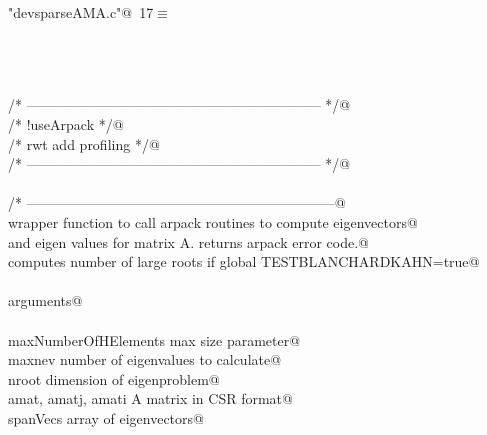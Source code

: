 \documentclass[12pt]{article}
\begin{document}
\begin{flushleft} \small
\begin{minipage}{\linewidth}\label{scrap5}\raggedright\small
{} \verb@"devsparseAMA.c"@\nobreak\ {\footnotesize {17}}$\equiv$
\vspace{-1ex}
\begin{list}{}{} \item
\mbox{}\verb@@\\
\mbox{}\verb@@\\
\mbox{}\verb@@\\
\mbox{}\verb@/* --------------------------------------------------------------- */@\\
\mbox{}\verb@/* !useArpack                                                      */@\\
\mbox{}\verb@/* rwt add profiling                                               */@\\
\mbox{}\verb@/* --------------------------------------------------------------- */@\\
\mbox{}\verb@@\\
\mbox{}\verb@/* ------------------------------------------------------------------@\\
\mbox{}\verb@        wrapper function to call arpack routines to compute eigenvectors@\\
\mbox{}\verb@        and eigen values for matrix A.  returns arpack error code.@\\
\mbox{}\verb@        computes number of large roots if global TESTBLANCHARDKAHN=true@\\
\mbox{}\verb@@\\
\mbox{}\verb@        arguments@\\
\mbox{}\verb@@\\
\mbox{}\verb@                maxNumberOfHElements                            max size parameter@\\
\mbox{}\verb@                maxnev                                                          number of eigenvalues to calculate@\\
\mbox{}\verb@                nroot                                                           dimension of eigenproblem@\\
\mbox{}\verb@                amat, amatj, amati                                      A matrix in CSR format@\\
\mbox{}\verb@                spanVecs                                                        array of eigenvectors@\\

\end{list}
\end{minipage}
\end{flushleft}
\end{document}
